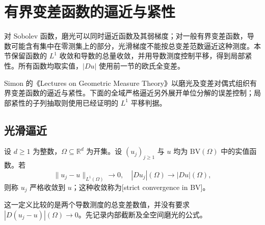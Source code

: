 \section{有界变差函数的逼近与紧性}
\label{b1:sec:2702}

对 Sobolev 函数，磨光可以同时逼近函数及其弱梯度；对一般有界变差函数，导数可能含有集中在零测集上的部分，光滑梯度不能按总变差范数逼近这种测度。本节保留函数的 \(L^1\) 收敛和导数的总量收敛，并用导数测度控制平移，得到局部紧性。所有函数均取实值，\(|Du|\) 使用前一节的欧氏全变差。

\ProseParagraphBreak

Simon 的《Lectures on Geometric Measure Theory》\cite[\S6, 6.2 LEMMA and 6.3 THEOREM]{Simon1983Lectures}以磨光及变差对偶式组织有界变差函数的逼近与紧性。下面的全域严格逼近另外展开单位分解的误差控制；局部紧性的子列抽取则使用已经证明的 \(L^1\) 平移判据。


\subsection{光滑逼近}
\label{b1:subsec:270201}

\begin{definition}\label{b1:def:bv-strict-convergence}
设 \(d\ge1\) 为整数，\(\Omega\subseteq\mathbb R^d\) 为开集。设 \((u_j)_{j\ge1}\) 与 \(u\) 均为 \(\mathrm{BV}(\Omega)\) 中的实值函数。若
\[
 \|u_j-u\|_{L^1(\Omega)}\longrightarrow0,\quad
 |Du_j|(\Omega)\longrightarrow|Du|(\Omega),
\]
则称 \(u_j\) 严格收敛到 \(u\)；这种收敛称为[strict convergence in BV]。
\end{definition}

这一定义比较的是两个导数测度的总变差数值，并没有要求
\(|D(u_j-u)|(\Omega)\to0\)。先记录内部截断及全空间磨光的公式。


